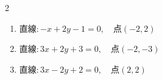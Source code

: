 \begin{multicols}{2}
\begin{enumerate}

  \item $直線:-x+2y-1=0,\quad 点 ( -2, 2 )$


  \item $直線:3x+2y+3=0,\quad 点 ( -2, -3 )$


  \item $直線:3x-2y+2=0,\quad 点 ( 2, 2 )$


\end{enumerate}
\end{multicols}

\newpage
\resetdrill

